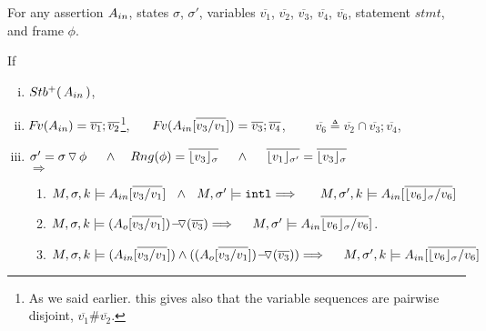\begin{lemma}
\label{l:calls}

For any assertion $\Ain$, states $\sigma$, $\sigma'$,  
variables  $\overline{v_1}$,    $\overline{v_2}$,  $\overline{v_3}$,  $\overline{v_4}$,  $\overline{v_6}$,  %
statement $stmt$, and frame $\phi$.

\noindent
If 
\begin{enumerate}[(i)]
\item 
\label{l:calls:r:one}
$ \Pos \Ain$,  
\item 
\label{l:calls:r:two}
$\fv(\Ain) =  \overline{v_1}; \overline{v_2} $\footnote{As we said earlier. this gives  also that the variable sequences  are pairwise disjoint, \ie $\overline{v_1}\#\overline{v_2}$.},
\ \ \ 
$\fv(\Ain[\overline {v_3/v_1}]) =  \overline{v_3}; \overline{v_4} $, \ \ \ \ 
$ \overline {v_6}\triangleq\overline{v_2}\cap\overline{v_3}; \overline{v_4} $, 
\item
$\sigma'=\sigma  \pushSymbol \phi  \ \ \ \  \wedge\ \ \  Rng(\phi)= \overline{\interpret {\sigma} {v_3} }\ \ \ \ \wedge \ \  \ \ \overline {\interpret {\sigma'}  {v_1} } = \overline {\interpret {\sigma} {v_3} }$ 
\\ 
$\Longrightarrow$

\begin{enumerate}
\item
\label{l:calls:callee:one}
$\satDAssertFrom M  \sigma k   \Ain[\overline {v_3/v_1}] %
\ \ \wedge\ \ M, \sigma' \models \intThis
 \hfill \Longrightarrow  \ \ \  \   \ \satDAssertFrom M  {\sigma'} k  {\Ain[\overline { {\interpret {\sigma} {v_6}} / {v_6} } ] } $
 
\item

\label{l:calls:callee:two}
$ \satDAssertFrom M  \sigma k    {\PushASLong  {(\overline {v_3})} {(\Ao[\overline {v_3/v_1}])}} 
\hfill \Longrightarrow  \ \ \  \  
M, \sigma' \models   {\Ain\overline { {\interpret {\sigma} {v_6}} / {v_6} } ] }$.


\item
\label{l:calls:callee:three}
$\satDAssertFrom M  \sigma k    {(\Ain[\overline {v_3/v_1}] ) \wedge  ({\PushASLong  {(\overline {v_3})} {(\Ao[\overline {v_3/v_1} ])} } ) }  
 \hfill \Longrightarrow  \ \ \  \   \satDAssertFrom M  {\sigma'} k  {\Ain[\overline  { {\interpret {\sigma} {v_6}} / {v_6} } ] }$


\end{enumerate}
\end{enumerate}

\end{lemma}


